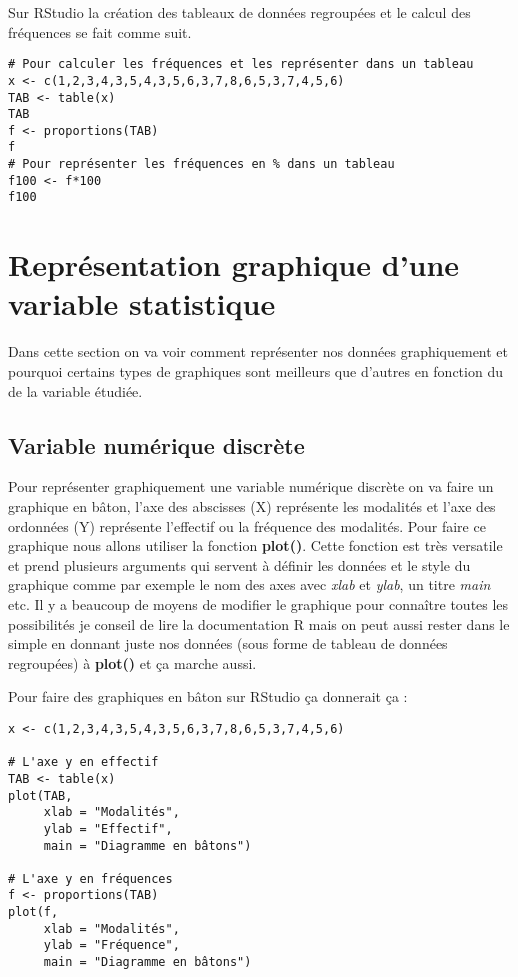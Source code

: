 \documentclass{report}
\begin{document}
Sur RStudio la création des tableaux de données regroupées et le calcul des fréquences se fait comme suit.

\begin{verbatim}
# Pour calculer les fréquences et les représenter dans un tableau
x <- c(1,2,3,4,3,5,4,3,5,6,3,7,8,6,5,3,7,4,5,6)
TAB <- table(x)
TAB
f <- proportions(TAB)
f
# Pour représenter les fréquences en % dans un tableau
f100 <- f*100
f100
\end{verbatim}

\section{Représentation graphique d’une variable statistique}

Dans cette section on va voir comment représenter nos données graphiquement et pourquoi certains types de graphiques sont meilleurs que d'autres en fonction du de la variable étudiée.

\subsection{Variable numérique discrète}

Pour représenter graphiquement une variable numérique discrète on va faire un graphique en bâton, l'axe des abscisses (X) représente les modalités et l'axe des ordonnées (Y) représente l'effectif ou la fréquence des modalités. Pour faire ce graphique nous allons utiliser la fonction \textbf{plot()}. Cette fonction est très versatile et prend plusieurs arguments qui servent à définir les données et le style du graphique comme par exemple le nom des axes avec \textit{xlab} et \textit{ylab}, un titre \textit{main} etc. Il y a beaucoup de moyens de modifier le graphique pour connaître toutes les possibilités je conseil de lire la documentation R mais on peut aussi rester dans le simple en donnant juste nos données (sous forme de tableau de données regroupées) à \textbf{plot()} et ça marche aussi.

Pour faire des graphiques en bâton sur RStudio ça donnerait ça :

\begin{verbatim}
x <- c(1,2,3,4,3,5,4,3,5,6,3,7,8,6,5,3,7,4,5,6)

# L'axe y en effectif
TAB <- table(x)
plot(TAB,
     xlab = "Modalités",
     ylab = "Effectif",
     main = "Diagramme en bâtons")

# L'axe y en fréquences 
f <- proportions(TAB)
plot(f,
     xlab = "Modalités",
     ylab = "Fréquence",
     main = "Diagramme en bâtons")
\end{verbatim}
\end{document}
